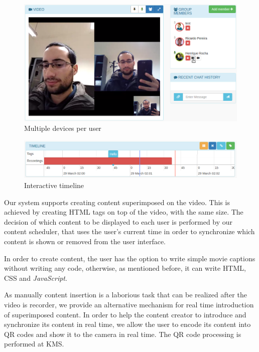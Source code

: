\documentclass[10pt,conference]{IEEEtran}
\begin{document}
	\begin{figure}
		\centering
		\includegraphics[width=\linewidth]{figures/devices.png}
		\caption{Multiple devices per user}
		\label{fig:devices}
	\end{figure}

	\begin{figure}
		\centering
		\includegraphics[width=\linewidth]{figures/timeline.png}
		\caption{Interactive timeline}
		\label{fig:timeline}
	\end{figure}




Our system supports creating content superimposed on the video.
This is achieved by creating \gls{HTML} tags on top of the video, with the same size.
The decision of which content to be displayed to each user is performed by our content scheduler, that uses the user's current time in order to synchronize which content is shown or removed from the user interface.

In order to create content, the user has the option to write simple movie captions without writing any code, otherwise, as mentioned before, it can write \gls{HTML}, \gls{CSS} and \emph{JavaScript}.

As manually content insertion is a laborious task that can be realized after the video is recorder, we provide an alternative mechanism for real time introduction of superimposed content.
In order to help the content creator to introduce and synchronize its content in real time, we allow the user to encode its content into \gls{QR} codes and show it to the camera in real time.
The \gls{QR} code processing is performed at \gls{KMS}.
\end{document}
